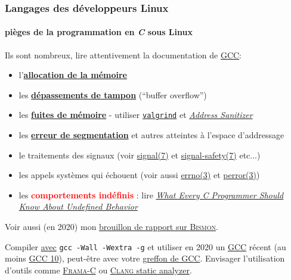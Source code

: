 \documentclass[xcolor=svgnames,final,smaller,a4]{beamer}
\begin{document}
\begin{frame}
  \frametitle{Langages des développeurs Linux}
  \framesubtitle{pièges de la programmation en \textit{C} sous Linux}

  Ils sont nombreux, lire attentivement la documentation de \href{http://gcc.gnu.org/}{GCC}:

  \begin{itemize}
    \item l'\href{https://fr.wikipedia.org/wiki/Allocation_de_mémoire}{\textbf{allocation de la mémoire}}
  \item les \href{https://fr.wikipedia.org/wiki/Dépassement_de_tampon}{\textbf{dépassements de tampon}} (``buffer overflow'')
  \item les
    \href{https://fr.wikipedia.org/wiki/Fuite_de_mémoire}{\textbf{fuites
        de mémoire}} - utiliser
    \href{https://valgrind.org/}{\texttt{valgrind}} et \href{https://en.wikipedia.org/wiki/AddressSanitizer}{\textit{Address Sanitizer}}
    \item les
      \href{https://fr.wikipedia.org/wiki/Erreur_de_segmentation}{\textbf{erreur
          de segmentation}} et autres atteintes à l'espace
      d'addressage
      \item le traitements des signaux (voir
        \href{https://man7.org/linux/man-pages/man7/signal.7.html}{signal(7)}
        et
        \href{https://man7.org/linux/man-pages/man7/signal-safety.7.html}{signal-safety(7)} etc...)
      \item les appels systèmes qui échouent (voir aussi  \href{https://man7.org/linux/man-pages/man3/errno.3.html}{errno(3)} et  \href{https://man7.org/linux/man-pages/man3/perror.3.html}{perror(3)})
        \item les \textcolor{red}{\textbf{comportements indéfinis}} :
          lire
          \href{http://blog.llvm.org/2011/05/what-every-c-programmer-should-know.html}{\textit{What
              Every C Programmer Should Know About Undefined
              Behavior}}
  \end{itemize}

  Voir aussi (en 2020) mon \href{http://starynkevitch.net/Basile/bismon-chariot-doc.pdf}{brouillon de rapport sur \textsc{Bismon}}.

  Compiler
  \href{https://gcc.gnu.org/onlinedocs/gcc/Invoking-GCC.html}{avec}
  \texttt{gcc -Wall -Wextra -g} et utiliser en 2020 un
  \href{http://gcc.gnu.org/}{GCC} récent (au moins
  \href{https://gcc.gnu.org/gcc-10/}{GCC 10}), peut-être avec votre
  \href{https://gcc.gnu.org/onlinedocs/gccint/Plugins.html}{greffon de
    GCC}. Envisager l'utilisation d'outils comme
  \href{https://frama-c.com/}{\textsc{Frama-C}} ou
  \href{https://clang-analyzer.llvm.org/}{\textsc{Clang} static
    analyzer}.
\end{frame}
\end{document}

